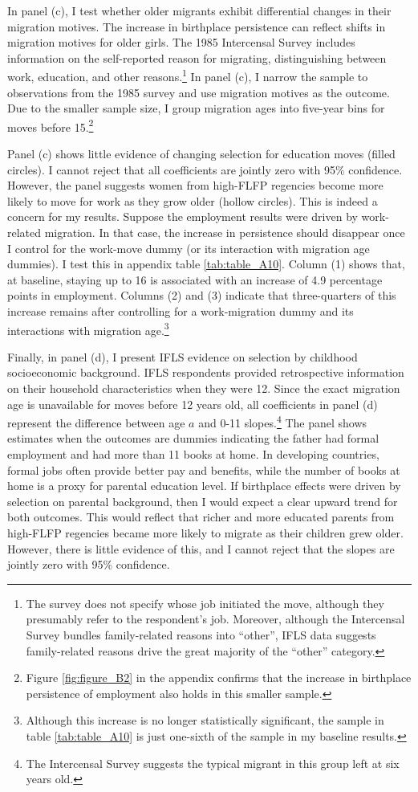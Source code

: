In panel (c), I test whether older migrants exhibit differential changes in their migration motives. The increase in birthplace persistence can reflect shifts in migration motives for older girls. The 1985 Intercensal Survey includes information on the self-reported reason for migrating, distinguishing between work, education, and other reasons.\footnote{The survey does not specify whose job initiated the move, although they presumably refer to the respondent's job. Moreover, although the Intercensal Survey bundles family-related reasons into ``other'', IFLS data suggests family-related reasons drive the great majority of the ``other'' category.} In panel (c), I narrow the sample to observations from the 1985 survey and use migration motives as the outcome. Due to the smaller sample size, I group migration ages into five-year bins for moves before 15.\footnote{Figure \ref{fig:figure_B2} in the appendix confirms that the increase in birthplace persistence of employment also holds in this smaller sample.}

Panel (c) shows little evidence of changing selection for education moves (filled circles). I cannot reject that all coefficients are jointly zero with 95\% confidence. However, the panel suggests women from high-FLFP regencies become more likely to move for work as they grow older (hollow circles). This is indeed a concern for my results. Suppose the employment results were driven by work-related migration. In that case, the increase in persistence should disappear once I control for the work-move dummy (or its interaction with migration age dummies). I test this in appendix table \ref{tab:table_A10}. Column (1) shows that, at baseline, staying up to 16 is associated with an increase of 4.9 percentage points in employment. Columns (2) and (3) indicate that three-quarters of this increase remains after controlling for a work-migration dummy and its interactions with migration age.\footnote{Although this increase is no longer statistically significant, the sample in table \ref{tab:table_A10} is just one-sixth of the sample in my baseline results.}


Finally, in panel (d), I present IFLS evidence on selection by childhood socioeconomic background. IFLS respondents provided retrospective information on their household characteristics when they were 12. Since the exact migration age is unavailable for moves before 12 years old, all coefficients in panel (d) represent the difference between age $a$ and 0-11 slopes.\footnote{The Intercensal Survey suggests the typical migrant in this group left at six years old.} The panel shows estimates when the outcomes are dummies indicating the father had formal employment and had more than 11 books at home. In developing countries, formal jobs often provide better pay and benefits, while the number of books at home is a proxy for parental education level. If birthplace effects were driven by selection on parental background, then I would expect a clear upward trend for both outcomes. This would reflect that richer and more educated parents from high-FLFP regencies became more likely to migrate as their children grew older. However, there is little evidence of this, and I cannot reject that the slopes are jointly zero with 95\% confidence.

